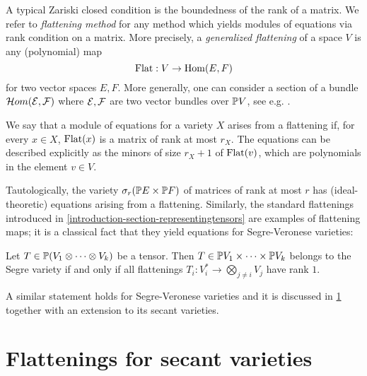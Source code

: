 A typical Zariski closed condition is the boundedness of the rank of a matrix. We refer to \emph{flattening method} for any method which yields modules of equations via rank condition on a matrix. More precisely, a \emph{generalized flattening} of a space $V$ is any (polynomial) map 
\[
\mathrm{Flat} : V \to \operatorname{Hom} ( E,F)
\]
for two vector spaces $E,F$. More generally, one can consider a section of a bundle $\mathcal{H}om(\mathcal{E},\mathcal{F})$ where $\mathcal{E},\mathcal{F}$ are two vector bundles over $\mathbb{P} V$, see e.g. \cite{EH88}.

We say that a module of equations for a variety $X$ arises from a flattening if, for every $x \in X$, $\mathrm{Flat}(x)$ is a matrix of rank at most $r_X$. The equations can be described explicitly as the minors of size $r_X+1$ of $\mathrm{Flat}(v)$, which are polynomials in the element $v \in V$.

Tautologically, the variety $\sigma_r( \mathbb{P} E \times \mathbb{P} F)$ of matrices of rank at most $r$ has (ideal-theoretic) equations arising from a flattening. Similarly, the standard flattenings introduced in \ref{introduction-section-representingtensors} are examples of flattening maps; it is a classical fact that they yield equations for Segre-Veronese varieties:
\begin{proposition}
 \label{RepTheory-proposition-standardFlatrank1}
 Let $T \in \mathbb{P} (V_1 \otimes \cdots \otimes V_k)$ be a tensor. Then $T \in \mathbb{P} V_1 \times \cdots \times \mathbb{P} V_k$ belongs to the Segre variety if and only if all flattenings $T_i : V_i^* \to \bigotimes _{j \neq i} V_j$ have rank $1$.
\end{proposition}
A similar statement holds for Segre-Veronese varieties and it is discussed in \ref{RepTheory-section-flatteningsSecants} together with an extension to its secant varieties.

\section{Flattenings for secant varieties}
\label{RepTheory-section-flatteningsSecants}

